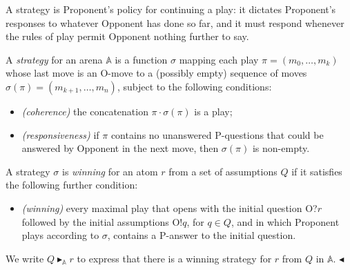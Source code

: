 \documentclass{lipics-v2021}
\newcommand{\fillBox}{\hfill$\blacktriangleleft$}
\newcommand{\wstrat}[1]{\blacktriangleright_{#1}}            %
\newcommand{\arena}[1]{\mathbb{#1}}                     %
\begin{document}
A strategy is Proponent's policy for continuing a play: it dictates Proponent's responses to whatever Opponent has done so far, and it must respond whenever the rules of play permit Opponent nothing further to say.
\begin{definition}[Strategy]
\label{def:strategy}
A \emph{strategy} for an arena $\arena{A}$ is a function $\sigma$ mapping
each play $\pi = (m_0,\ldots,m_k)$ whose last move is an O-move to
a (possibly empty) sequence of moves $\sigma(\pi) = (m_{k+1}, \ldots, m_n)$,
subject to the following conditions:
\begin{itemize}[align=left]
    \item \emph{(coherence)} the concatenation
          $\pi \cdot \sigma(\pi)$ is a play;
    \item \emph{(responsiveness)} if $\pi$ contains no unanswered P-questions that could be answered by Opponent in the next move, then $\sigma(\pi)$ is non-empty.
\end{itemize}
A strategy $\sigma$ is \emph{winning} for an atom $r$ from a set of
assumptions $Q$ if it satisfies the following further condition:
\begin{itemize}
    \item \emph{(winning)} every maximal play that opens with the initial
          question O?$r$ followed by the initial assumptions O!$q$, for
          $q \in Q$, and in which Proponent plays according to $\sigma$,
          contains a P-answer to the initial question.
\end{itemize}
We write $Q \wstrat{\arena{A}} r$ to express that there is a winning
strategy for $r$ from $Q$ in $\arena{A}$. \fillBox
\end{definition}
 
\end{document}
